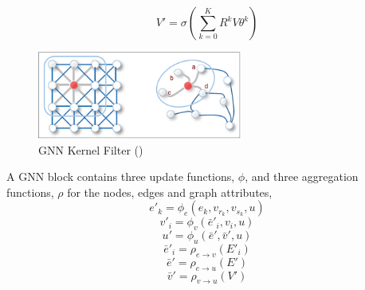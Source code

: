 \documentclass{report} %
\begin{document}
\[ V' = \sigma (\sum_{k=0}^{K}R^{k}V\theta^{k}) \]

\begin{figure}[H]
    \centering
    \includegraphics[width=0.6\textwidth]{./ReportImages/GNNKernel.png} 
    \caption{\ac{GNN} Kernel Filter (\cite{GNN-2019})}
    \label{fig:GNN Kernel Filter}
\end{figure}

A \ac{GNN} block contains three update functions, \( \phi \), and three aggregation functions, \( \rho \) for the nodes, edges and graph attributes, \cite{GNNs-2018}
\[
e'_k = \phi_e(e_k, v_{r_k}, v_{s_k}, u)
\]
\[
v'_i = \phi_v(\bar{e}'_i, v_i, u)
\]
\[
u' = \phi_u(\bar{e}', \bar{v}', u)
\]
\[
\bar{e}'_i = \rho_{e \to v}(E'_i)
\]
\[
\bar{e}' = \rho_{e \to u}(E')
\]
\[
\bar{v}' = \rho_{v \to u}(V')
\]


\listoffigures

\newpage 

\listoftables

\newpage 
\end{document}
